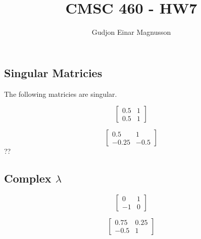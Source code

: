 \documentclass[12pt]{article}
\begin{document}
\title{CMSC 460 - HW7}
\author{Gudjon Einar Magnusson}

\maketitle

\section{}



\section{}

\section{}




\subsection{Singular Matricies}

The following matricies are singular. 

\[
\begin{bmatrix}
    0.5 & 1 \\
    0.5 & 1
\end{bmatrix}
\]

\[
\begin{bmatrix}
    0.5 & 1 \\
    -0.25 & -0.5
\end{bmatrix}
\]??

\subsection{Complex $\lambda$}

\[
\begin{bmatrix}
    0 & 1 \\
    -1 & 0
\end{bmatrix}
\]

\[
\begin{bmatrix}
    0.75 & 0.25 \\
    -0.5 & 1
\end{bmatrix}
\]
\end{document}
